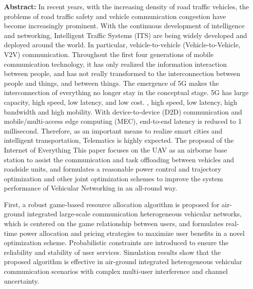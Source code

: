 \makeatletter
  \pagestyle{fancy}%
  \fancyhf{}
\makeatother
\vspace{0.39cm}  %
\noindent\textbf{Abstract: }In recent years, with the increasing density of road traffic vehicles, the problems of road traffic safety and vehicle communication congestion have become increasingly prominent.
With the continuous development of intelligence and networking, Intelligent Traffic Systems (ITS) are being widely developed and deployed around the world. In particular,
vehicle-to-vehicle (Vehicle-to-Vehicle, V2V) communication. Throughout the first four generations of mobile communication technology, it has only realized the information interaction
between people, and has not really transformed to the interconnection between people and things, and between things. The emergence of 5G makes the interconnection of everything no
longer stay in the conceptual stage. 5G has large capacity, high speed, low latency, and low cost. , high speed, low latency, high bandwidth and high mobility. With device-to-device
(D2D) communication and mobile/multi-access edge computing (MEC), end-to-end latency is reduced to 1 millisecond. Therefore, as an important means to realize smart cities and intelligent
transportation, Telematics is highly expected. The proposal of the Internet of Everything This paper focuses on the UAV as an airborne base station to assist the communication and task
offloading between vehicles and roadside units, and formulates a reasonable power control and trajectory optimization and other joint optimization schemes to improve the system
performance of Vehicular Networking in an all-round way.

First, a robust game-based resource allocation algorithm is proposed for air-ground integrated large-scale communication heterogeneous vehicular networks, which is
centered on the game relationship between users, and formulates real-time power allocation and pricing strategies to maximize user benefits in a novel optimization
scheme. Probabilistic constraints are introduced to ensure the reliability and stability of user services. Simulation results show that the proposed algorithm is
effective in air-ground integrated heterogeneous vehicular communication scenarios with complex multi-user interference and channel uncertainty.

